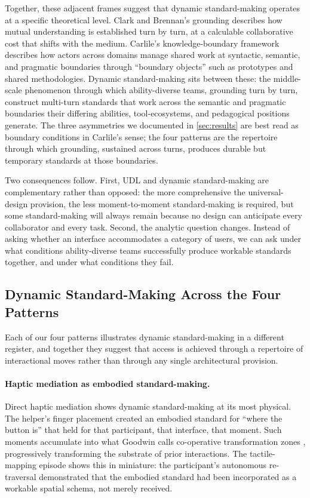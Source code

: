 Together, these adjacent frames suggest that dynamic standard-making operates at a specific theoretical level. Clark and Brennan's \cite{clark_grounding_1991} grounding describes how mutual understanding is established turn by turn, at a calculable collaborative cost that shifts with the medium. Carlile's \cite{carlile_transferring_2004} knowledge-boundary framework describes how actors across domains manage shared work at syntactic, semantic, and pragmatic boundaries through ``boundary objects'' such as prototypes and shared methodologies. Dynamic standard-making sits between these: the middle-scale phenomenon through which ability-diverse teams, grounding turn by turn, construct multi-turn standards that work across the semantic and pragmatic boundaries their differing abilities, tool-ecosystems, and pedagogical positions generate. The three asymmetries we documented in \autoref{sec:results} are best read as boundary conditions in Carlile's sense; the four patterns are the repertoire through which grounding, sustained across turns, produces durable but temporary standards at those boundaries.

Two consequences follow. First, UDL and dynamic standard-making are complementary rather than opposed: the more comprehensive the universal-design provision, the less moment-to-moment standard-making is required, but some standard-making will always remain because no design can anticipate every collaborator and every task. Second, the analytic question changes. Instead of asking whether an interface accommodates a category of users, we can ask under what conditions ability-diverse teams successfully produce workable standards together, and under what conditions they fail.

\subsection{Dynamic Standard-Making Across the Four Patterns}

Each of our four patterns illustrates dynamic standard-making in a different register, and together they suggest that access is achieved through a repertoire of interactional moves rather than through any single architectural provision.

\paragraph{Haptic mediation as embodied standard-making.}
Direct haptic mediation shows dynamic standard-making at its most physical. The helper's finger placement created an embodied standard for ``where the button is'' that held for that participant, that interface, that moment. Such moments accumulate into what Goodwin calls co-operative transformation zones \cite{goodwin_co-operative_2013}, progressively transforming the substrate of prior interactions. The tactile-mapping episode shows this in miniature: the participant's autonomous re-traversal demonstrated that the embodied standard had been incorporated as a workable spatial schema, not merely received.


